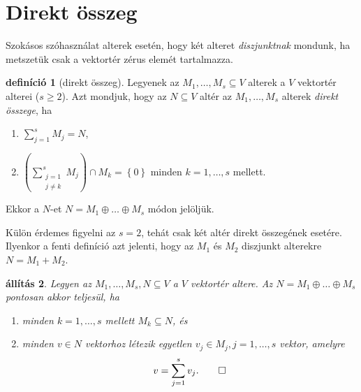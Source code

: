 \documentclass[9pt, showtrims]{memoir}
\theoremstyle{plain}
\newtheorem{proposition}{állítás}[section]
\theoremstyle{remark}
\theoremstyle{definition}
\newtheorem{definition}[proposition]{definíció}
\begin{document}
\section{Direkt összeg}
Szokásos szóhasználat alterek esetén, hogy két alteret \emph{diszjunktnak}
mondunk,
ha metszetük csak a vektortér zérus elemét tartalmazza.
\begin{definition}[direkt összeg]
    Legyenek az $M_1,\dots,M_s\subseteq V$ alterek a $V$ vektortér alterei ($s\geq 2$).
    Azt mondjuk, hogy az $N\subseteq V$ altér az $M_1,\dots,M_s$ alterek \emph{direkt összege},
    ha
    \begin{enumerate}
        \item $\sum_{j=1}^sM_j=N$,
        \item $\left( \sum_{\substack{j=1\\j\neq k}}^sM_j \right)\cap M_k
            =
            \left\{ 0 \right\}$ 
            minden $k=1,\dots,s$ mellett.
    \end{enumerate}
    Ekkor a $N$-et $N=M_1\oplus\dots\oplus M_s$ módon jelöljük.
\end{definition}
Külön érdemes figyelni az $s=2$, tehát csak két altér direkt összegének esetére.
Ilyenkor a fenti definíció azt jelenti, 
hogy az $M_1$ és $M_2$ diszjunkt alterekre $N=M_1+M_2$.
\begin{proposition}
    Legyen az $M_1,\dots,M_s,N\subseteq V$ a $V$ vektortér altere. 
    Az $N=M_1\oplus\dots\oplus M_s$ pontosan akkor teljesül,
    ha 
    \begin{enumerate}
        \item minden $k=1,\dots,s$ mellett $M_k\subseteq N$, és
        \item 
            minden $v\in N$ vektorhoz létezik egyetlen $v_j\in M_j, j=1,\dots,s$ 
            vektor, amelyre
            \[
                v=\sum_{j=1}^sv_j.\qedhere
            \]
    \end{enumerate}
\end{proposition}
\end{document}
